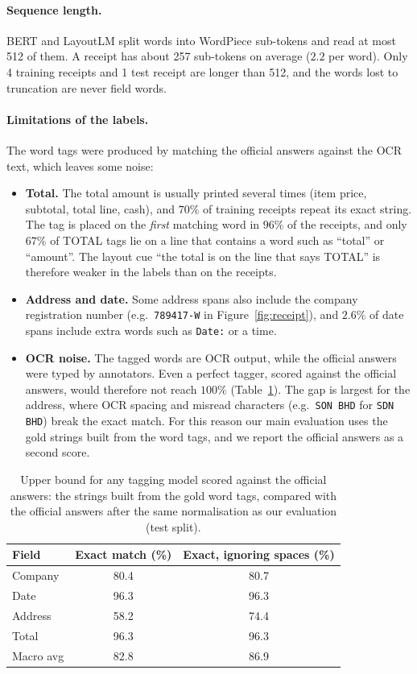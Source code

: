 \paragraph{Sequence length.}
BERT and LayoutLM split words into WordPiece sub-tokens and read at most 512 of them. A receipt has about 257 sub-tokens on average ($2.2$ per word). Only 4 training receipts and 1 test receipt are longer than 512, and the words lost to truncation are never field words.

\paragraph{Limitations of the labels.}
The word tags were produced by matching the official answers against the OCR text, which leaves some noise:
\begin{itemize}
  \item \textbf{Total.} The total amount is usually printed several times (item price, subtotal, total line, cash), and $70\%$ of training receipts repeat its exact string. The tag is placed on the \emph{first} matching word in $96\%$ of the receipts, and only $67\%$ of TOTAL tags lie on a line that contains a word such as ``total'' or ``amount''. The layout cue ``the total is on the line that says TOTAL'' is therefore weaker in the labels than on the receipts.
  \item \textbf{Address and date.} Some address spans also include the company registration number (e.g.\ \texttt{789417-W} in Figure~\ref{fig:receipt}), and $2.6\%$ of date spans include extra words such as \texttt{Date:} or a time.
  \item \textbf{OCR noise.} The tagged words are OCR output, while the official answers were typed by annotators. Even a perfect tagger, scored against the official answers, would therefore not reach $100\%$ (Table~\ref{tab:ceiling}). The gap is largest for the address, where OCR spacing and misread characters (e.g.\ \texttt{SON BHD} for \texttt{SDN BHD}) break the exact match. For this reason our main evaluation uses the gold strings built from the word tags, and we report the official answers as a second score.
\end{itemize}

\begin{table}[t]
  \centering
  \small
  \begin{tabular}{lcc}
    \toprule
    Field & Exact match (\%) & Exact, ignoring spaces (\%) \\
    \midrule
    Company   & 80.4 & 80.7 \\
    Date      & 96.3 & 96.3 \\
    Address   & 58.2 & 74.4 \\
    Total     & 96.3 & 96.3 \\
    \midrule
    Macro avg & 82.8 & 86.9 \\
    \bottomrule
  \end{tabular}
  \caption{Upper bound for any tagging model scored against the official answers: the strings built from the gold word tags, compared with the official answers after the same normalisation as our evaluation (test split).}
  \label{tab:ceiling}
\end{table}
